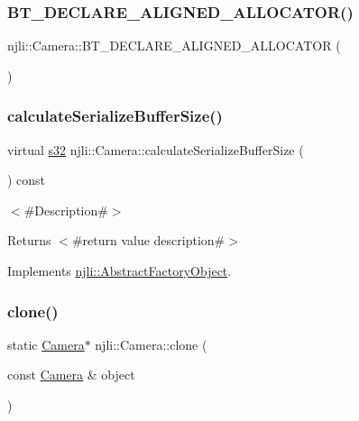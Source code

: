 \subsubsection{\texorpdfstring{B\+T\+\_\+\+D\+E\+C\+L\+A\+R\+E\+\_\+\+A\+L\+I\+G\+N\+E\+D\+\_\+\+A\+L\+L\+O\+C\+A\+T\+O\+R()}{BT\_DECLARE\_ALIGNED\_ALLOCATOR()}}
{\footnotesize\ttfamily njli\+::\+Camera\+::\+B\+T\+\_\+\+D\+E\+C\+L\+A\+R\+E\+\_\+\+A\+L\+I\+G\+N\+E\+D\+\_\+\+A\+L\+L\+O\+C\+A\+T\+OR (\begin{DoxyParamCaption}{ }\end{DoxyParamCaption})\hspace{0.3cm}{\ttfamily [protected]}}

\mbox{\label{classnjli_1_1_camera_a67d01c2010a70ccdbd3d9962bba57407}} 
\subsubsection{\texorpdfstring{calculate\+Serialize\+Buffer\+Size()}{calculateSerializeBufferSize()}}
{\footnotesize\ttfamily virtual \mbox{\hyperlink{_util_8h_aa62c75d314a0d1f37f79c4b73b2292e2}{s32}} njli\+::\+Camera\+::calculate\+Serialize\+Buffer\+Size (\begin{DoxyParamCaption}{ }\end{DoxyParamCaption}) const\hspace{0.3cm}{\ttfamily [virtual]}}

$<$\#\+Description\#$>$

\begin{DoxyReturn}{Returns}
$<$\#return value description\#$>$ 
\end{DoxyReturn}


Implements \mbox{\hyperlink{classnjli_1_1_abstract_factory_object_a4763d05bc9dc37c559111f8bb30e1dd8}{njli\+::\+Abstract\+Factory\+Object}}.

\mbox{\label{classnjli_1_1_camera_af4d6b31f5b697697ced38c081005167d}} 
\subsubsection{\texorpdfstring{clone()}{clone()}}
{\footnotesize\ttfamily static \mbox{\hyperlink{classnjli_1_1_camera}{Camera}}$\ast$ njli\+::\+Camera\+::clone (\begin{DoxyParamCaption}\item[{const \mbox{\hyperlink{classnjli_1_1_camera}{Camera}} \&}]{object }\end{DoxyParamCaption})\hspace{0.3cm}{\ttfamily [static]}}

